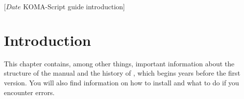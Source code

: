 %
%
%
%
%
%
%
%
% 
%
%
%
%

                 [$Date$
                  KOMA-Script guide introduction]


\chapter{Introduction}

This chapter contains, among other things, important information about the 
structure of the manual and the history of {\KOMAScript}, which begins 
years before the first version. You will also find information on how to
install {\KOMAScript} and what to do if you encounter errors.

